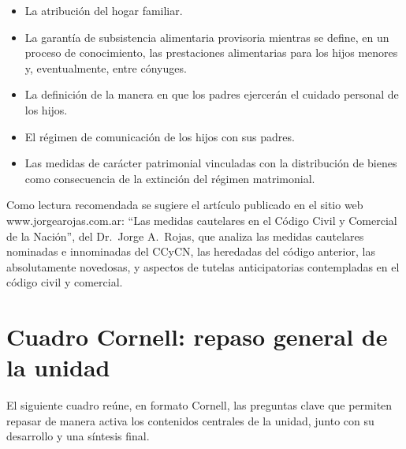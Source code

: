 \documentclass[12pt,oneside]{book}
\begin{document}
\begin{itemize}
    \item La atribución del hogar familiar.
    \item La garantía de subsistencia alimentaria provisoria mientras se define, en un proceso de conocimiento, las prestaciones alimentarias para los hijos menores y, eventualmente, entre cónyuges.
    \item La definición de la manera en que los padres ejercerán el cuidado personal de los hijos.
    \item El régimen de comunicación de los hijos con sus padres.
    \item Las medidas de carácter patrimonial vinculadas con la distribución de bienes como consecuencia de la extinción del régimen matrimonial.
\end{itemize}

\begin{note}
Como lectura recomendada se sugiere el artículo publicado en el sitio web www.jorgearojas.com.ar: ``Las medidas cautelares en el Código Civil y Comercial de la Nación'', del Dr.\ Jorge A.\ Rojas, que analiza las medidas cautelares nominadas e innominadas del CCyCN, las heredadas del código anterior, las absolutamente novedosas, y aspectos de tutelas anticipatorias contempladas en el código civil y comercial.
\end{note}

\chapter{Cuadro Cornell: repaso general de la unidad}

El siguiente cuadro reúne, en formato Cornell, las preguntas clave que permiten repasar de manera activa los contenidos centrales de la unidad, junto con su desarrollo y una síntesis final.
\end{document}
